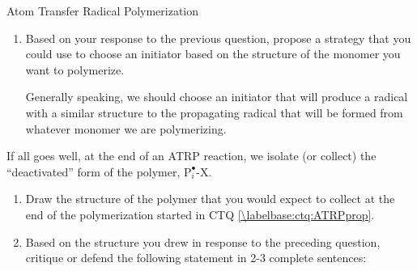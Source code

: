 \begin{activity}{Atom Transfer Radical Polymerization}
\begin{ctqs}
\begin{enumerate}
			\begin{solution}[1.25in]
				Yes, EBriB should be a good initiator for methacrylate monomers.  Because they form essentially identical radical centers, the equilibrium constants for the initial equilibrium and ATRP equilibrium should be similar, which helps ensure that all of the initiator molecules will be likely to activate before any of the chains get too long.
				
				Strictly speaking, ensuring that all chains activate ``at once'' (as required for a living polymerization) would require the equilibrium constant for the initial equilibrium to be higher than that for the ATRP equilibrium, but in practice, having these be roughly equal works well enough.
			\end{solution}
			
			\item Based on your response to the previous question, propose a strategy that you could use to choose an initiator based on the structure of the monomer you want to polymerize.
	
			\begin{solution}[1.25in]
			
				Generally speaking, we should choose an initiator that will produce a radical with a similar structure to the propagating radical that will be formed from whatever monomer we are polymerizing.
			
			\end{solution}
			
		\end{enumerate}
		
	\question If all goes well, at the end of an ATRP reaction, we isolate (or collect) the ``deactivated'' form of the polymer, $\text{P}_i^\bullet\text{-X}$.
	
		\begin{enumerate}
			\item Draw the structure of the polymer that you would expect to collect at the end of the polymerization started in CTQ \ref{\labelbase:ctq:ATRPprop}.
				
				\begin{solution}[1.5in]
		\studentdisplay{~}
				\end{solution}
			
			\item Based on the structure you drew in response to the preceding question, critique or defend the following statement in 2-3 complete sentences:
			

\end{enumerate}
\end{ctqs}
\end{activity}
